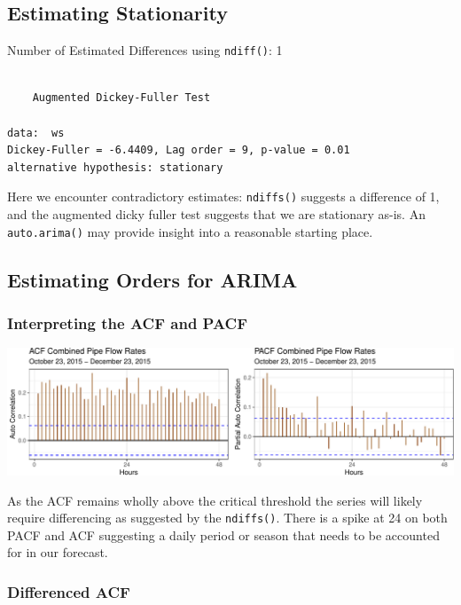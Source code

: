 \documentclass[openany]{book}
\begin{document}
\hypertarget{estimating-stationarity}{%
\subsection{Estimating Stationarity}\label{estimating-stationarity}}

Number of Estimated Differences using \texttt{ndiff()}: 1

\begin{verbatim}

    Augmented Dickey-Fuller Test

data:  ws
Dickey-Fuller = -6.4409, Lag order = 9, p-value = 0.01
alternative hypothesis: stationary
\end{verbatim}

Here we encounter contradictory estimates: \texttt{ndiffs()} suggests a
difference of 1, and the augmented dicky fuller test suggests that we
are stationary as-is. An \texttt{auto.arima()} may provide insight into
a reasonable starting place.

\hypertarget{estimating-orders-for-arima}{%
\subsection{Estimating Orders for
ARIMA}\label{estimating-orders-for-arima}}

\hypertarget{interpreting-the-acf-and-pacf}{%
\subsubsection{Interpreting the ACF and
PACF}\label{interpreting-the-acf-and-pacf}}

\includegraphics{Group2_Project1_Fall2019_files/figure-latex/unnamed-chunk-17-1.pdf}

As the ACF remains wholly above the critical threshold the series will
likely require differencing as suggested by the \texttt{ndiffs()}. There
is a spike at 24 on both PACF and ACF suggesting a daily period or
season that needs to be accounted for in our forecast.

\hypertarget{differenced-acf}{%
\subsubsection{Differenced ACF}\label{differenced-acf}}
\end{document}

